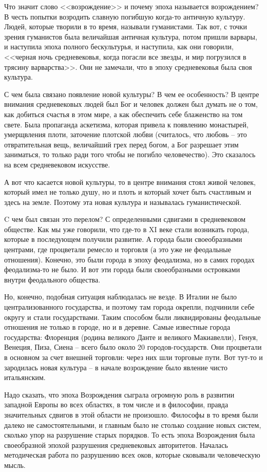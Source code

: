 Что значит слово <<возрождение>> и почему эпоха называется возрождением? В честь попытки возродить славную погибшую когда-то античную культуру. Людей, которые творили в то время, называли гуманистами. Так вот, с точки зрения гуманистов была величайшая античная культура, потом пришли варвары, и наступила эпоха полного бескультурья, и наступила, как они говорили, <<черная ночь средневековья, когда погасли все звезды, и мир погрузился в трясину варварства>>. Они не замечали, что в эпоху средневековья была своя культура.

С чем была связано появление новой культуры? В чем ее особенность? В центре внимания средневековых людей был Бог и человек должен был думать не о том, как добиться счастья в этом мире, а как обеспечить себе блаженство на том свете. Была пропаганда аскетизма, которая привела к появлению монастырей, умерщвления плоти, заточение плотской любви (считалось, что любовь – это отвратительная вещь, величайший грех перед богом, а Бог разрешает этим заниматься, то только ради того чтобы не погибло человечество). Это сказалось на всем средневековом искусстве.

    А вот что касается новой культуры, то в центре внимания стоял живой человек, который имел не только душу, но и плоть и который хочет быть счастливым и здесь на земле. Поэтому эта новая культура и называлась гуманистической.

C чем был связан это перелом? С определенными сдвигами в средневековом обществе. Как мы уже говорили, что где-то в XI веке стали возникать города, которые в последующем получили развитие. А города были своеобразными центрами, где процветали ремесло и торговля (а это уже не феодальные отношения). Конечно, это были города в эпоху феодализма, но в самих городах феодализма-то не было. И вот эти города были своеобразными островками внутри феодального общества.

Но, конечно, подобная ситуация наблюдалась не везде. В Италии не было централизованного государства, и поэтому там города окрепли, подчинили себе округу и стали государствами. Таким способом были ликвидированы феодальные отношения не только в городе, но и в деревне. Самые известные города государства: Флоренция (родина великого Данте и великого Макиавелли), Генуя, Венеция, Пиза, Сиена – всего было около 20 городов-государств. Они процветали в основном за счет внешней торговли: через них шли торговые пути. Вот тут-то и зародилась новая культура – в начале возрождение было явление чисто итальянским.

Надо сказать, что эпоха Возрождения сыграла огромную роль в развитии западной Европы во всех областях, в том числе и в философии, правда значительных сдвигов в этой области не произошло. Философы в то время были далеко не самостоятельными, и главным было не столько создание новых систем, сколько упор на разрушение старых порядков. То есть эпоха Возрождения была своеобразной эпохой разрушения средневековых авторитетов. Началась методическая работа по разрушению всех оков, которые сковывали человеческую мысль.

